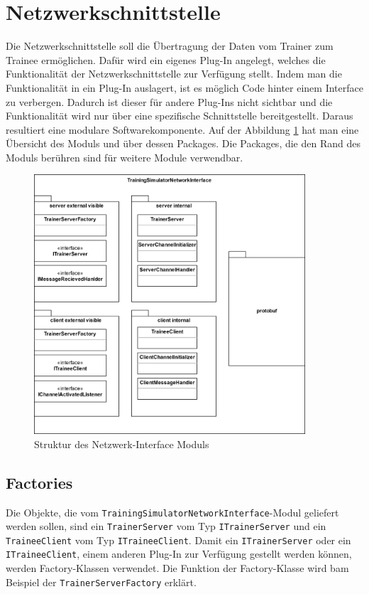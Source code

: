 \section{Netzwerkschnittstelle}
Die Netzwerkschnittstelle soll die Übertragung der Daten vom Trainer zum Trainee ermöglichen. Dafür wird ein eigenes Plug-In angelegt, welches die Funktionalität der Netzwerkschnittstelle zur Verfügung stellt. Indem man die Funktionalität in ein Plug-In auslagert, ist es möglich Code hinter einem Interface zu verbergen. Dadurch ist dieser für andere Plug-Ins nicht sichtbar und die Funktionalität wird nur über eine spezifische Schnittstelle bereitgestellt. Daraus resultiert eine modulare Softwarekomponente.
Auf der Abbildung \ref{fig:NetworkInterface} hat man eine Übersicht des Moduls und über dessen Packages. Die Packages, die den Rand des Moduls berühren sind für weitere Module verwendbar.

\begin{figure}[ht]
    \centering
    \includegraphics[width=0.9\textwidth]{content/assets/Kapitel4/NetworkInterface.png}
    \caption{Struktur des Netzwerk-Interface Moduls}
    \label{fig:NetworkInterface}
\end{figure}

\subsection{Factories}
Die Objekte, die vom \texttt{TrainingSimulatorNetworkInterface}-Modul geliefert werden sollen, sind ein \texttt{TrainerServer} vom Typ \texttt{ITrainerServer} und ein \texttt{TraineeClient} vom Typ \texttt{ITraineeClient}. Damit ein \texttt{ITrainerServer} oder ein \texttt{ITraineeClient}, einem anderen Plug-In zur Verfügung gestellt werden können, werden Factory-Klassen verwendet. Die Funktion der Factory-Klasse wird bam Beispiel der \texttt{TrainerServerFactory} erklärt.

